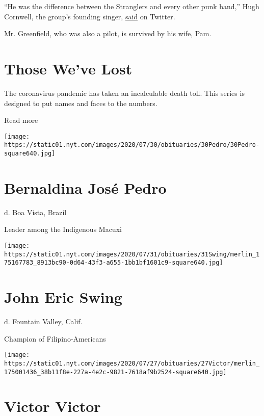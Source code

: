 ``He was the difference between the Stranglers and every other punk
band,'' Hugh Cornwell, the group's founding singer,
\href{https://twitter.com/HughCornwell/status/1257349295742779392?s=20}{said}
on Twitter.

Mr. Greenfield, who was also a pilot, is survived by his wife, Pam.

\href{https://www.nytimes.com/interactive/2020/obituaries/people-died-coronavirus-obituaries.html?action=click\&pgtype=Article\&state=default\&region=BELOW_MAIN_CONTENT\&context=covid_obits_promo}{}

\hypertarget{those-weve-lost}{%
\section{Those We've Lost}\label{those-weve-lost}}

The coronavirus pandemic has taken an incalculable death toll. This
series is designed to put names and faces to the numbers.

Read more

\texttt{[image: https://static01.nyt.com/images/2020/07/30/obituaries/30Pedro/30Pedro-square640.jpg]}

\hypertarget{bernaldina-josuxe9-pedro}{%
\section{Bernaldina José Pedro}\label{bernaldina-josuxe9-pedro}}

d. Boa Vista, Brazil

Leader among the Indigenous Macuxi

\texttt{[image: https://static01.nyt.com/images/2020/07/31/obituaries/31Swing/merlin\_175167783\_8913bc90-0d64-43f3-a655-1bb1bf1601c9-square640.jpg]}

\hypertarget{john-eric-swing}{%
\section{John Eric Swing}\label{john-eric-swing}}

d. Fountain Valley, Calif.

Champion of Filipino-Americans

\texttt{[image: https://static01.nyt.com/images/2020/07/27/obituaries/27Victor/merlin\_175001436\_38b11f8e-227a-4e2c-9821-7618af9b2524-square640.jpg]}

\hypertarget{victor-victor}{%
\section{Victor Victor}\label{victor-victor}}


